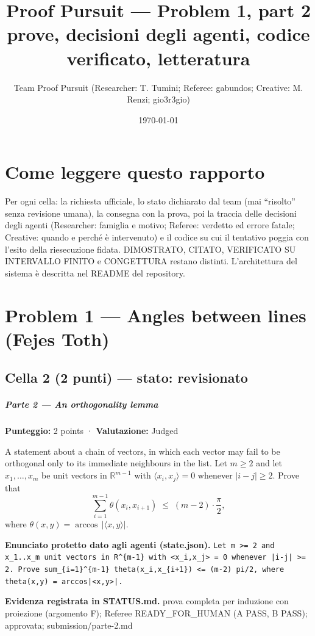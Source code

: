 \documentclass[11pt,a4paper]{article}
\title{Proof Pursuit --- Problem 1, part 2\\ \large prove, decisioni degli agenti, codice verificato, letteratura}
\author{Team Proof Pursuit (Researcher: T. Tumini; Referee: gabundos; Creative: M. Renzi; gio3r3gio)}
\date{\today}
\begin{document}
\maketitle\tableofcontents
\section*{Come leggere questo rapporto}
Per ogni cella: la richiesta ufficiale, lo stato dichiarato dal team (mai ``risolto'' senza revisione umana), la consegna
con la prova, poi la traccia delle decisioni degli agenti (Researcher: famiglia e motivo; Referee: verdetto ed errore
fatale; Creative: quando e perché è intervenuto) e il codice su cui il tentativo poggia con l'esito della riesecuzione
fidata. DIMOSTRATO, CITATO, VERIFICATO SU INTERVALLO FINITO e CONGETTURA restano distinti. L'architettura del sistema
è descritta nel README del repository.
\section{Problem 1 — Angles between lines (Fejes Toth)}
\subsection{Cella 2 (2 punti) — stato: revisionato}
\subparagraph{Parte 2 --- An orthogonality
lemma}\label{parte-2-an-orthogonality-lemma}

\textbf{Punteggio:} 2 points · \textbf{Valutazione:} Judged

A statement about a chain of vectors, in which each vector may fail to
be orthogonal only to its immediate neighbours in the list. Let
\(m \ge 2\) and let \(x_1, \ldots, x_m\) be unit vectors in
\(\mathbb{R}^{m-1}\) with \(\langle x_i, x_j \rangle = 0\) whenever
\(|i - j| \ge 2\). Prove that \[
\sum_{i=1}^{m-1} \theta(x_i, x_{i+1}) \;\le\; (m-2) \cdot \frac{\pi}{2},
\] where \(\theta(x,y) = \arccos\,\lvert \langle x, y \rangle \rvert\).

\textbf{Enunciato protetto dato agli agenti (state.json).} \texttt{Let m \textgreater{}= 2 and x\_1..x\_m unit vectors in R\textasciicircum{}\{m-1\} with \textless{}x\_i,x\_j\textgreater{} = 0 whenever |i-j| \textgreater{}= 2. Prove sum\_\{i=1\}\textasciicircum{}\{m-1\} theta(x\_i,x\_\{i+1\}) \textless{}= (m-2) pi/2, where theta(x,y) = arccos|\textless{}x,y\textgreater{}|.}

\textbf{Evidenza registrata in STATUS.md.} prova completa per induzione con proiezione (argomento F); Referee READY\_FOR\_HUMAN (A PASS, B PASS); approvata; submission/parte-2.md
\end{document}
